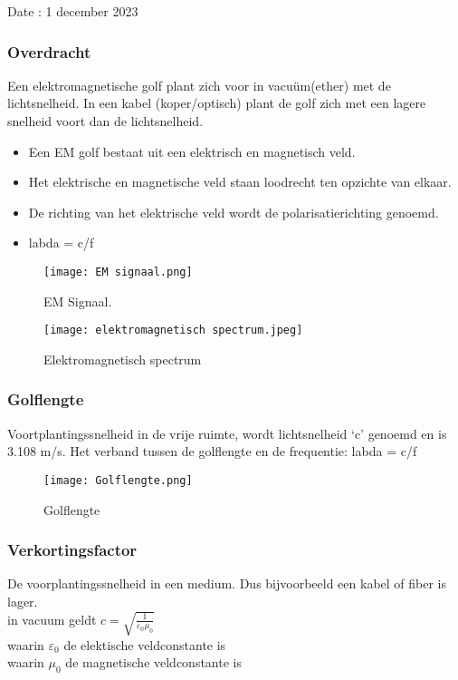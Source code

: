 Date : 1 december 2023

\subsubsection{Overdracht}

Een elektromagnetische golf plant zich voor in vacuüm(ether) met de
lichtsnelheid.
In een kabel (koper/optisch) plant de golf zich met een lagere snelheid voort
dan de lichtsnelheid.
\begin{itemize}[label=$\bullet$]
    \item Een EM golf bestaat uit een elektrisch en magnetisch veld.
    \item Het elektrische en magnetische veld staan loodrecht ten opzichte van elkaar.
    \item De richting van het elektrische veld wordt    de polarisatierichting genoemd.
    \item labda = c/f
  \end{itemize}

\begin{figure}[H]
\centering
\texttt{[image: EM signaal.png]}
\caption{EM Signaal.}
\end{figure}

\begin{figure}[H]
\centering
\texttt{[image: elektromagnetisch spectrum.jpeg]}
\caption{Elektromagnetisch spectrum}
\end{figure}


\subsubsection{Golflengte}

Voortplantingssnelheid in de vrije ruimte, wordt lichtsnelheid ‘c’
genoemd en is 3.108 m/s. 
Het verband tussen de golflengte en de frequentie: labda = c/f

\begin{figure}[H]
\centering
\texttt{[image: Golflengte.png]}
\caption{Golflengte}
\end{figure}

\subsubsection{Verkortingsfactor}

De voorplantingssnelheid in een medium. Dus bijvoorbeeld een kabel
of fiber is lager.\\
in vacuum geldt \(c = \sqrt{\frac{1}{\varepsilon_0 \mu_0}}\)\\
waarin \(\varepsilon_0\) de elektische veldconstante is\\
waarin \(\mu_0\) de magnetische veldconstante is\\

